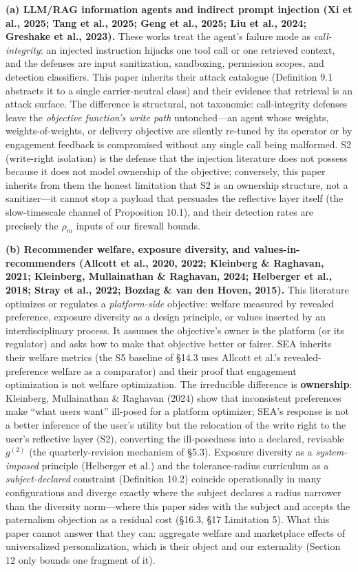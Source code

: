 \documentclass[
  11pt]{article}
\begin{document}
\textbf{(a) LLM/RAG information agents and indirect prompt injection (Xi
et al., 2025; Tang et al., 2025; Geng et al., 2025; Liu et al., 2024;
Greshake et al., 2023).} These works treat the agent's failure mode as
\emph{call-integrity}: an injected instruction hijacks one tool call or
one retrieved context, and the defenses are input sanitization,
sandboxing, permission scopes, and detection classifiers. This paper
inherits their attack catalogue (Definition 9.1 abstracts it to a single
carrier-neutral class) and their evidence that retrieval is an attack
surface. The difference is structural, not taxonomic: call-integrity
defenses leave the \emph{objective function's write path} untouched---an
agent whose weights, weights-of-weights, or delivery objective are
silently re-tuned by its operator or by engagement feedback is
compromised without any single call being malformed. S2 (write-right
isolation) is the defense that the injection literature does not possess
because it does not model ownership of the objective; conversely, this
paper inherits from them the honest limitation that S2 is an ownership
structure, not a sanitizer---it cannot stop a payload that persuades the
reflective layer itself (the slow-timescale channel of Proposition
10.1), and their detection rates are precisely the \(\rho_m\) inputs of
our firewall bounds.

\textbf{(b) Recommender welfare, exposure diversity, and
values-in-recommenders (Allcott et al., 2020, 2022; Kleinberg \&
Raghavan, 2021; Kleinberg, Mullainathan \& Raghavan, 2024; Helberger et
al., 2018; Stray et al., 2022; Bozdag \& van den Hoven, 2015).} This
literature optimizes or regulates a \emph{platform-side} objective:
welfare measured by revealed preference, exposure diversity as a design
principle, or values inserted by an interdisciplinary process. It
assumes the objective's owner is the platform (or its regulator) and
asks how to make that objective better or fairer. SEA inherits their
welfare metrics (the S5 baseline of §14.3 uses Allcott et al.'s
revealed-preference welfare as a comparator) and their proof that
engagement optimization is not welfare optimization. The irreducible
difference is \textbf{ownership}: Kleinberg, Mullainathan \& Raghavan
(2024) show that inconsistent preferences make ``what users want''
ill-posed for a platform optimizer; SEA's response is not a better
inference of the user's utility but the relocation of the write right to
the user's reflective layer (S2), converting the ill-posedness into a
declared, revisable \(g^{(2)}\) (the quarterly-revision mechanism of
§5.3). Exposure diversity as a \emph{system-imposed} principle
(Helberger et al.) and the tolerance-radius curriculum as a
\emph{subject-declared} constraint (Definition 10.2) coincide
operationally in many configurations and diverge exactly where the
subject declares a radius narrower than the diversity norm---where this
paper sides with the subject and accepts the paternalism objection as a
residual cost (§16.3, §17 Limitation 5). What this paper cannot answer
that they can: aggregate welfare and marketplace effects of
universalized personalization, which is their object and our externality
(Section 12 only bounds one fragment of it).
\end{document}
